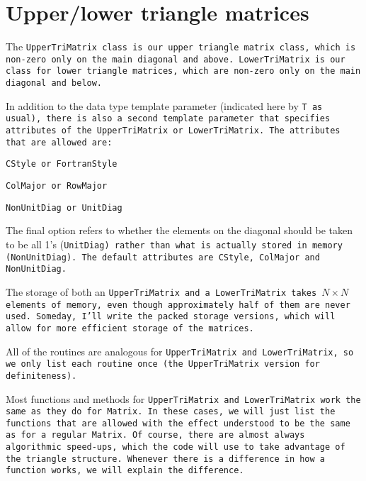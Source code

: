 
\section{Upper/lower triangle matrices}
\label{TriMatrix}

The \tt{UpperTriMatrix} class is our upper triangle matrix class, which is non-zero
only on the main diagonal and above.  \tt{LowerTriMatrix} is our class for lower
triangle matrices, which are non-zero only on the main diagonal and below.

In addition to the data type template parameter (indicated here by \tt{T} as usual),
there is also a second template parameter that specifies attributes of the
\tt{UpperTriMatrix} or \tt{LowerTriMatrix}.  The attributes that are allowed are:
\begin{description} \itemsep -2pt
\item[$\bullet$] \tt{CStyle} or \tt{FortranStyle}
\item[$\bullet$] \tt{ColMajor} or \tt{RowMajor}
\item[$\bullet$] \tt{NonUnitDiag} or \tt{UnitDiag}
\end{description}
The final option refers to whether the elements on the diagonal should be 
taken to be all 1's (\tt{UnitDiag}) rather than what is actually stored 
in memory (\tt{NonUnitDiag}).
The default attributes are \tt{CStyle}, \tt{ColMajor} and \tt{NonUnitDiag}.

The storage of both an \tt{UpperTriMatrix} and a \tt{LowerTriMatrix} takes
$N \times N$ elements of memory, even though approximately half of them 
are never used.  Someday, I'll write the packed storage versions, which will
allow for more efficient storage of the matrices.

All of the routines are analogous for \tt{UpperTriMatrix} and 
\tt{LowerTriMatrix}, so we only list each routine once 
(the \tt{UpperTriMatrix} version for definiteness).  

Most functions and methods for \tt{UpperTriMatrix} and \tt{LowerTriMatrix}
work the same as they do for \tt{Matrix}.
In these cases, we will just list the functions that are allowed with the
effect understood to be the same as for a regular \tt{Matrix}.  Of course, there are 
almost always algorithmic speed-ups, which the code will use to take advantage of the 
triangle structure.
Whenever there is a difference in how a function works,
we will explain the difference.

